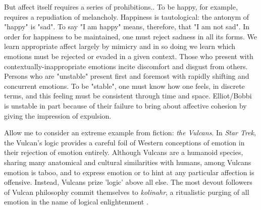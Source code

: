 \documentclass[letterpaper,12pt]{turabian-researchpaper}
\begin{document}
But affect itself requires a series of prohibitions.. To be happy, for example, requires a repudiation of melancholy. Happiness is tautological: the antonym of "happy" is "sad". To say "I am happy" means, therefore, that "I am not sad". In order for happiness to be maintained, one must reject sadness in all its forms. We learn appropriate affect largely by mimicry and in so doing we learn which emotions must be rejected or evaded in a given context. Those who present with contextually-inappropriate emotions incite discomfort and disgust from others. Persons who are "unstable" present first and foremost with rapidly shifting and concurrent emotions. To be "stable", one must know how one feels, in discrete terms, and this feeling must be consistent through time and space. Elliot/Bobbi is unstable in part because of their failure to bring about affective cohesion by giving the impression of expulsion.

Allow me to consider an extreme example from fiction: \textit{the Vulcans}. In \textit{Star Trek}, the Vulcan's logic provides a careful foil of Western conceptions of emotion in their rejection of emotion entirely. Although Vulcans are a humanoid species, sharing many anatomical and cultural similarities with humans, among Vulcans emotion is taboo, and to express emotion or to hint at any particular affection is offensive. Instead, Vulcans prize 'logic' above all else. The most devout followers of Vulcan philosophy commit themselves to \textit{kolinahr}, a ritualistic purging of all emotion in the name of logical enlightenment \autocite{dawson_andorian_2001}.
\end{document}
